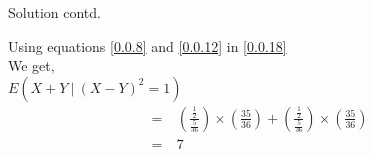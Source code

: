\documentclass{beamer}
\providecommand{\brak}[1]{\ensuremath{\left(#1\right)}}
\begin{document}
\begin{frame}{Solution contd.}
\begin{block}{}
    Using equations \eqref{0.0.8} and \eqref{0.0.12} in \eqref{0.0.18}\\
    We get,\\
    \newline
    $E\brak{X+Y\:|\:(X-Y)^2=1}$
    \begin{align}
        =&\:\brak{\frac{\frac{1}{2}}{\frac{5}{36}}}\times\brak{\frac{35}{36}}+\brak{\frac{\frac{1}{2}}{\frac{5}{36}}}\times\brak{\frac{35}{36}}\\
        =&\:7
    \end{align}
    \end{block}
\end{frame}
\end{document}
